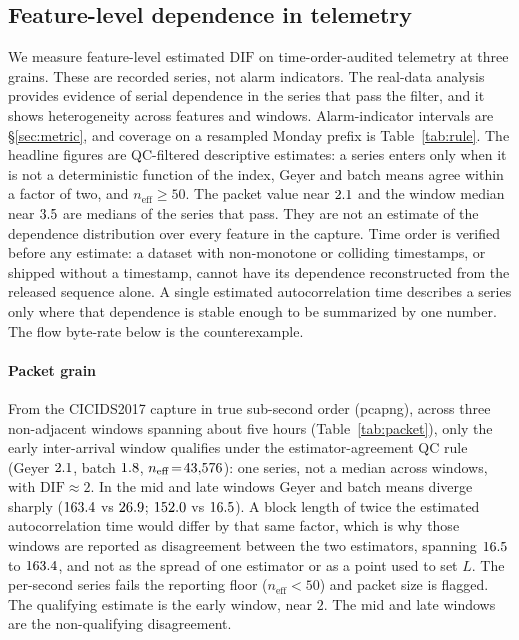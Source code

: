 \documentclass[a4paper,fleqn]{cas-dc}
\newcommand{\DIF}{\mathrm{DIF}}
\newcommand{\neff}{n_{\mathrm{eff}}}
\newcommand{\tabwidth}{\columnwidth}
\newcommand{\tabbody}{\small\setlength{\tabcolsep}{3.5pt}\renewcommand{\arraystretch}{1.08}}
\newcommand{\fulltab}{\renewcommand{\tabwidth}{\textwidth}\tabbody}
\begin{document}
\subsection{Feature-level dependence in telemetry}\label{sec:dif}
We measure feature-level estimated $\DIF$ on time-order-audited telemetry at three grains. These
are recorded series, not alarm indicators. The real-data analysis provides evidence of serial
dependence in the series that pass the filter, and it shows heterogeneity across features and
windows. Alarm-indicator intervals are \S\ref{sec:metric}, and coverage on a resampled Monday
prefix is Table~\ref{tab:rule}. The headline figures are
QC-filtered descriptive estimates: a series enters only when it is not a deterministic function of
the index, Geyer and batch means agree within a factor of two, and $\neff\ge50$. The packet value
near $2.1$ and the window median near $3.5$ are medians of the series that pass. They are not an
estimate of the dependence distribution over every feature in the capture. Time order is verified before
any estimate: a dataset with non-monotone or colliding timestamps, or shipped without a timestamp,
cannot have its dependence reconstructed from the released sequence alone. A single estimated
autocorrelation time describes a series only where that dependence is stable enough to be
summarized by one number. The flow byte-rate below is the counterexample.

\paragraph{Packet grain} From the CICIDS2017 capture in true sub-second order (pcapng), across
three non-adjacent windows spanning about five hours (Table~\ref{tab:packet}), only the early
inter-arrival window qualifies under the estimator-agreement QC rule (Geyer $2.1$, batch
$1.8$, $\neff\!=\!\PktQNeff$): one series, not a median across windows, with
$\DIF\!\approx\!2$. In the mid and late windows Geyer and batch means diverge sharply
($163.4$ vs $26.9$; $152.0$ vs $16.5$). A
block length of twice the estimated autocorrelation time would differ by that same factor, which is
why those windows are reported as disagreement between the two estimators, spanning $16.5$
to $163.4$, and not as the spread of one estimator or as a point used to set $L$. The per-second series fails
the reporting floor ($\neff\!<\!50$) and packet size is flagged. The qualifying estimate is the early
window, near $2$. The mid and late windows are the non-qualifying disagreement.
\begin{table}[!t]
\centering
\caption{Packet-grain $\DIF$, three non-adjacent CICIDS2017 windows (true pcapng order), with window
length, $\neff$ and agreement-rule status. From \texttt{results/packet\_windows.csv}.}\label{tab:packet}
\fulltab

\end{table}
\end{document}
